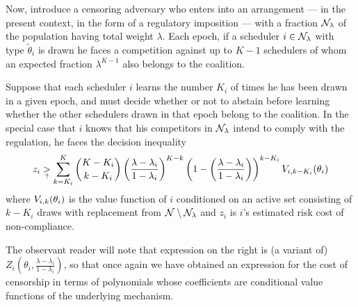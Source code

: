 Now, introduce a censoring adversary who enters into an arrangement --- in the present context, in the form of a regulatory imposition --- with a fraction $\mathcal{N}_\lambda$ of the population having total weight $\lambda$.
%
Each epoch, if a scheduler $i\in\mathcal{N}_\lambda$ with type $\tilde\theta_i$ is drawn he faces a competition against up to $K-1$ schedulers of whom an expected fraction $\lambda^{K-1}$ also belongs to the coalition.

Suppose that each scheduler $i$ learns the number $K_i$ of times he has been drawn in a given epoch, and must decide whether or not to abstain before learning whether the other schedulers drawn in that epoch belong to the coalition.
%
In the special case that $i$ knows that his competitors in $\mathcal{N}_\lambda$ intend to comply with the regulation, he faces the decision inequality
%
\[
  z_i \underset{?}{>} \sum_{k=K_i}^K {K-K_i \choose k-K_i} \left( \frac{\lambda-\lambda_i}{1-\lambda_i} \right)^{K-k} \left(1-\left( \frac{\lambda-\lambda_i}{1-\lambda_i} \right)\right)^{k-K_i} V_{i,k-K_i}(\theta_i)
\]
%
where $V_{i,k}(\theta_i)$ is the value function of $i$ conditioned on an active set consisting of $k-K_i$ draws with replacement from $\mathcal{N}\setminus\mathcal{N}_\lambda$ and $z_i$ is $i$'s estimated risk cost of non-compliance.

The observant reader will note that expression on the right is (a variant of) $Z_i\left(\theta_i, \frac{\lambda-\lambda_i}{1-\lambda_i} \right)$, so that once again we have obtained an expression for the cost of censorship in terms of polynomials whose coefficients are conditional value functions of the underlying mechanism.



\begin{comment}

  \subsection{Negotiation}
\begin{remark}[Negotiation]

  For simplicity, in this paper we mostly assume that the type distributions of schedulers are common knowledge, and that moreover before contracting there is no negotiation phase through which the adversary could elicit additional private information about the type of his counterparty: he must simply make a take-it-or-leave-it offer based on the common prior.

\end{remark}

\end{comment}








